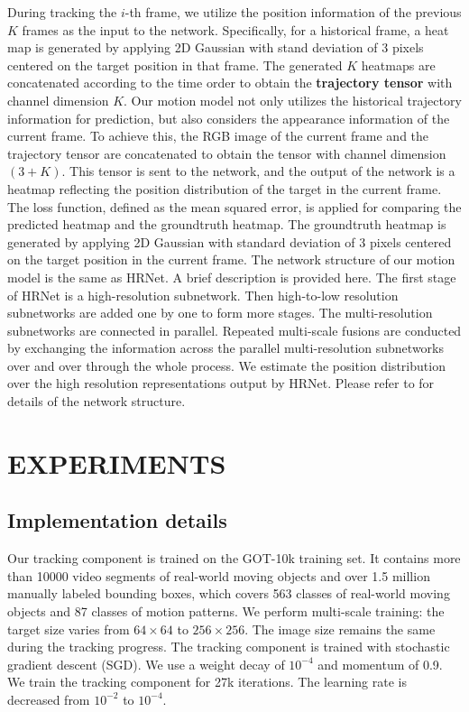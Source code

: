During tracking the $i$-th frame, we utilize the position information of the previous $K$ frames as the input to the network.
Specifically, for a historical frame, a heat map is generated by applying 2D Gaussian with stand deviation of 3 pixels centered on the target position in that frame.
The generated $K$ heatmaps are concatenated according to the time order to obtain the \textbf{trajectory tensor} with channel dimension $K$.
Our motion model not only utilizes the historical trajectory information for prediction, but also considers the appearance information of the current frame.
To achieve this, the RGB image of the current frame and the trajectory tensor are concatenated to obtain the tensor with channel dimension $(3+K)$. This tensor is sent to the network, and the output of the network is a heatmap reflecting the position distribution of the target in the current frame. The loss function, defined as the mean squared error, is applied for comparing the predicted heatmap and the groundtruth heatmap. The groundtruth heatmap is generated by applying 2D Gaussian with standard deviation of 3 pixels centered on the target position in the current frame. The network structure of our motion model is the same as HRNet. 
\fi
A brief description is provided here. The first stage of HRNet is a high-resolution subnetwork. Then high-to-low resolution subnetworks are added one by one to form more stages. The multi-resolution subnetworks are connected in parallel. Repeated multi-scale fusions are conducted by exchanging the information across the parallel multi-resolution subnetworks over and over through the whole process. We estimate the position distribution over the high resolution representations output by HRNet. Please refer to \cite{sun2019deep} for details of the network structure.

\section{EXPERIMENTS}
\label{sec:experiments}

\subsection{Implementation details}
Our tracking component is trained on the GOT-10k \cite{GOT-10k} training set. It contains more than 10000 video segments of real-world moving objects and over 1.5 million manually labeled bounding boxes, which covers 563 classes of real-world moving objects and 87 classes of motion patterns.
We perform multi-scale training: the target size varies from $64 \times 64$ to $256 \times 256$. The image size remains the same during the tracking progress. The tracking component is trained with stochastic gradient descent (SGD). We use a weight decay of $10^{-4}$ and momentum of 0.9. We train the tracking component for 27k iterations. The learning rate is decreased from $10^{-2}$ to $10^{-4}$.

